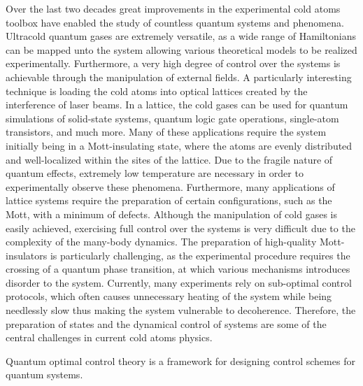 Over the last two decades great improvements in the experimental cold atoms toolbox have enabled the study of countless quantum systems and phenomena. Ultracold quantum gases are extremely versatile, as a wide range of Hamiltonians can be mapped unto the system allowing various theoretical models to be realized experimentally. Furthermore, a very high degree of control over the systems is achievable through the manipulation of external fields.
A particularly interesting technique is loading the cold atoms into optical lattices created by the interference of laser beams. In a lattice, the cold gases can be used for quantum simulations of solid-state systems, quantum logic gate operations, single-atom transistors, and much more. Many of these applications require the system initially being in a Mott-insulating state, where the atoms are evenly distributed and well-localized within the sites of the lattice.
Due to the fragile nature of quantum effects, extremely low temperature are necessary in order to experimentally observe these phenomena. Furthermore, many applications of lattice systems require the preparation of certain configurations, such as the Mott, with a minimum of defects. Although the manipulation of cold gases is easily achieved, exercising full control over the systems is very difficult due to the complexity of the many-body dynamics. The preparation of high-quality Mott-insulators is particularly challenging, as the experimental procedure requires the crossing of a quantum phase transition, at which various mechanisms introduces disorder to the system. Currently, many experiments rely on sub-optimal control protocols, which often causes unnecessary heating of the system while being needlessly slow thus making the system vulnerable to decoherence.
Therefore, the preparation of states and the dynamical control of systems are some of the central challenges in current cold atoms physics.

Quantum optimal control theory is a framework for designing control schemes for quantum systems. 

